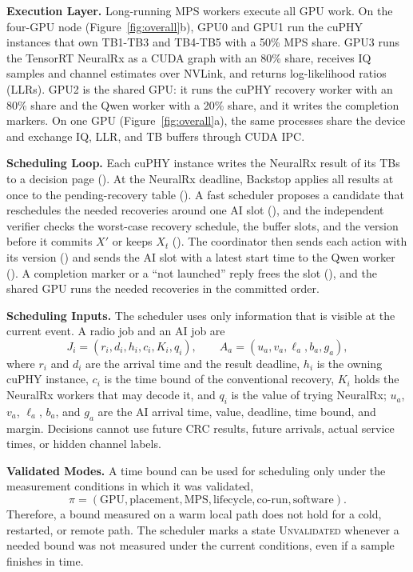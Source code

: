 \documentclass[acmsmall,screen,review,anonymous]{acmart}
\newcommand{\sys}{Backstop\xspace}
\newcommand{\UQ}{\textsc{Unvalidated}\xspace}
\newcommand{\NRx}{NeuralRx\xspace}
\begin{document}
\noindent\textbf{Execution Layer.}
Long-running MPS workers execute all GPU work. On the four-GPU node (Figure~\ref{fig:overall}b), GPU0 and
GPU1 run the cuPHY instances that own TB1-TB3 and TB4-TB5 with a 50\% MPS share. GPU3 runs the TensorRT
\NRx as a CUDA graph with an 80\% share, receives IQ samples and channel estimates over NVLink, and
returns log-likelihood ratios (LLRs). GPU2 is the shared GPU: it runs the cuPHY recovery worker with an
80\% share and the Qwen worker with a 20\% share, and it writes the completion markers. On one GPU
(Figure~\ref{fig:overall}a), the same processes share the device and exchange IQ, LLR, and TB buffers
through CUDA IPC.

\noindent\textbf{Scheduling Loop.}
Each cuPHY instance writes the \NRx result of its TBs to a decision page (). At the \NRx
deadline, \sys applies all results at once to the pending-recovery table (). A fast scheduler
proposes a candidate that reschedules the needed recoveries around one AI slot (), and the
independent verifier checks the worst-case recovery schedule, the buffer slots, and the version before it
commits $X'$ or keeps $X_t$ (). The coordinator then sends each action with its version
() and sends the AI slot with a latest start time to the Qwen worker (). A completion
marker or a ``not launched'' reply frees the slot (), and the shared GPU runs the needed
recoveries in the committed order.

\noindent\textbf{Scheduling Inputs.}
The scheduler uses only information that is visible at the current event. A radio job and an AI job are
\begin{equation}
 J_i=(r_i,d_i,h_i,c_i,K_i,q_i), \qquad
 A_a=(u_a,v_a,\ell_a,b_a,g_a),
\end{equation}
where $r_i$ and $d_i$ are the arrival time and the result deadline, $h_i$ is the owning cuPHY
instance, $c_i$ is the time bound of the conventional recovery, $K_i$ holds the \NRx workers that may
decode it, and $q_i$ is the value of trying \NRx; $u_a$, $v_a$, $\ell_a$, $b_a$, and $g_a$ are the AI
arrival time, value, deadline, time bound, and margin. Decisions cannot use future CRC results, future
arrivals, actual service times, or hidden channel labels.

\noindent\textbf{Validated Modes.}
A time bound can be used for scheduling only under the measurement conditions in which it was validated,
\begin{equation}
 \pi=(\text{GPU},\text{placement},\text{MPS},\text{lifecycle},\text{co-run},\text{software}).
\end{equation}
Therefore, a bound measured on a warm local path does not hold for a cold, restarted, or remote path. The
scheduler marks a state \UQ whenever a needed bound was not measured under the current conditions, even
if a sample finishes in time.
\end{document}
